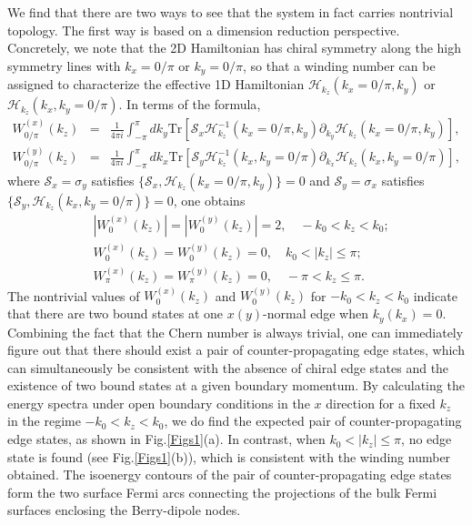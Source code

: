 \documentclass[aps,prl,twocolumn,longbibliography]{revtex4-1}
\begin{document}
\begin{widetext}
We find that there are two ways to see
that the system in fact carries nontrivial topology. The first way is based on a dimension reduction perspective.
Concretely, we note that the 2D Hamiltonian
has chiral symmetry along the high symmetry lines with $k_{x}=0/\pi$ or  $k_{y}=0/\pi$, so that a winding number can be assigned
to characterize the effective 1D Hamiltonian $\mathcal{H}_{k_{z}}(k_{x}=0/\pi,k_{y})$ or $\mathcal{H}_{k_{z}}(k_{x},k_{y}=0/\pi)$.
In terms of the formula\cite{Ryu2010},
\begin{eqnarray}
W^{(x)}_{0/\pi}(k_{z})&=&\frac{1}{4\pi i}\int_{-\pi}^{\pi}dk_{y}\text{Tr}[\mathcal{S}_{x}\mathcal{H}_{k_{z}}^{-1}(k_{x}=0/\pi,k_{y})
\partial_{k_{y}}\mathcal{H}_{k_{z}}(k_{x}=0/\pi,k_{y})],\nonumber\\
W^{(y)}_{0/\pi}(k_{z})&=&\frac{1}{4\pi i}\int_{-\pi}^{\pi}dk_{x}\text{Tr}[\mathcal{S}_{y}\mathcal{H}_{k_{z}}^{-1}(k_{x},k_{y}=0/\pi)
\partial_{k_{x}}\mathcal{H}_{k_{z}}(k_{x},k_{y}=0/\pi)],
\end{eqnarray}
where $\mathcal{S}_{x}=\sigma_{y}$ satisfies $\{\mathcal{S}_{x}, \mathcal{H}_{k_{z}}(k_{x}=0/\pi,k_{y})\}=0$
and $\mathcal{S}_{y}=\sigma_{x}$ satisfies $\{\mathcal{S}_{y}, \mathcal{H}_{k_{z}}(k_{x},k_{y}=0/\pi)\}=0$, one obtains
\begin{eqnarray}
&|W^{(x)}_{0}(k_{z})|=|W^{(y)}_{0}(k_{z})|=2, \quad -k_{0}<k_{z}<k_{0}; \nonumber\\
&W^{(x)}_{0}(k_{z})=W^{(y)}_{0}(k_{z})=0, \quad k_{0}<|k_{z}|\leq\pi; \nonumber\\
&W^{(x)}_{\pi}(k_{z})=W^{(y)}_{\pi}(k_{z})=0, \quad -\pi <k_{z}\leq\pi.
\end{eqnarray}
The nontrivial values of $W^{(x)}_{0}(k_{z})$ and $W^{(y)}_{0}(k_{z})$ for $-k_{0}<k_{z}<k_{0}$ indicate
that there are two bound states at one $x(y)$-normal edge when $k_{y}(k_{x})=0$.
Combining the fact that the Chern number is always trivial, one can immediately figure out
that there should exist a pair of counter-propagating edge states, which can simultaneously
be consistent with the absence of chiral edge states and the existence of two bound states
at a given boundary momentum. By calculating the energy spectra under open boundary conditions
in the $x$ direction for a fixed $k_{z}$ in the regime $-k_{0}<k_{z}<k_{0}$, we do
find the expected pair of counter-propagating edge states, as shown in Fig.\ref{Figs1}(a). In contrast,
when $k_{0}<|k_{z}|\leq\pi$, no edge state is found (see Fig.\ref{Figs1}(b)), which is consistent with the winding number
obtained. The isoenergy contours of the pair of counter-propagating edge states form the two surface Fermi arcs
connecting the projections of the bulk Fermi surfaces enclosing the Berry-dipole nodes.


\end{widetext}
\end{document}
